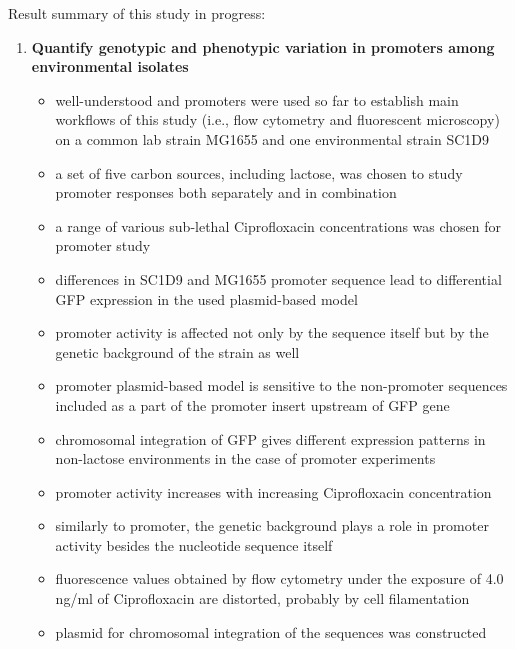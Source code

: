 \bigbreak
Result summary of this study in progress:
\begin{enumerate}[font=\bfseries]

    \item \textbf{Quantify genotypic and phenotypic variation in promoters among environmental  isolates}
    
    \begin{itemize}
    
        \item well-understood  and  promoters were used so far to establish main workflows of this study (i.e., flow cytometry and fluorescent microscopy) on a common lab strain MG1655 and one environmental strain SC1\textunderscore D9
        \item a set of five carbon sources, including lactose, was chosen to study  promoter responses both separately and in combination
        \item a range of various sub-lethal Ciprofloxacin concentrations was chosen for  promoter study
        \item differences in SC1\textunderscore D9 and MG1655  promoter sequence lead to differential GFP expression in the used plasmid-based model
        \item {} promoter activity is affected not only by the sequence itself but by the genetic background of the strain as well
        \item {} promoter plasmid-based model is sensitive to the non-promoter sequences included as a part of the promoter insert upstream of GFP gene
        \item chromosomal integration of GFP gives different expression patterns in non-lactose environments in the case of  promoter experiments
        \item {} promoter activity increases with increasing Ciprofloxacin concentration
        \item similarly to  promoter, the genetic background plays a role in  promoter activity besides the nucleotide sequence itself
        \item fluorescence values obtained by flow cytometry under the exposure of 4.0 ng/ml of Ciprofloxacin are distorted, probably by cell filamentation
        \item plasmid for chromosomal integration of the  sequences was constructed
    
    \end{itemize}

\end{enumerate} 

